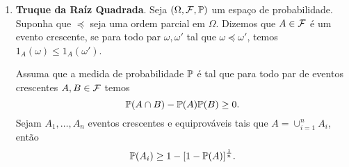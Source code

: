 \begin{enumerate}[leftmargin=*]
\item {\bf Truque da Raíz Quadrada}. 
Seja $(\Omega,\F,\P)$ um espaço de probabilidade. 
Suponha que $\preceq$ seja uma ordem parcial em $\Omega$.
Dizemos que $A\in\F$ é um evento crescente, 
se para todo par $\omega,\omega'$ tal que 
$\omega\preceq \omega'$, temos 
$1_{A}(\omega)\leq 1_{A}(\omega')$.

Assuma que a medida de probabilidade $\P$ é tal que
para todo par de eventos crescentes $A,B\in\F$ temos
	\begin{equation}\label{eq-exercicio-truque-raiz}
		\P(A\cap B) -\P(A)\P(B) \geq 0.
	\end{equation}
%
Sejam $A_1,\ldots,A_n$ eventos crescentes e equiprováveis tais que 
$A = \cup_{i=1}^n A_i$, então 
	\[
		\P(A_i)\geq 1-[1-\P(A)]^{\frac{1}{n}}.
	\]






























\end{enumerate}